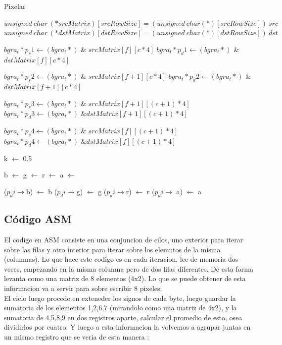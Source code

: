 	\begin{algorithm}[h!]
\caption{Pixelar}
\begin{algorithmic}
	\State $unsigned~ char~ (*srcMatrix)[srcRowSize] = (unsigned~ char (*)[srcRowSize])~ src$
	\State $unsigned~ char~ (*dstMatrix)[dstRowSize] = (unsigned~ char (*)[dstRowSize])~ dst$
	
			\State $bgra_t* p_s1 \gets (bgra_t*)$ \& $srcMatrix[f][c * 4]$
			\State $bgra_t *p_d1 \gets (bgra_t*)$ \&$dstMatrix[f][c * 4]$
			
			\State $bgra_t* p_s2 \gets (bgra_t*)$ \& $srcMatrix[f+1][c * 4]$
			\State $bgra_t *p_d2 \gets (bgra_t*)$ \&$dstMatrix[f+1][c * 4]$
			
			\State $bgra_t* p_s3 \gets (bgra_t*)$ \& $srcMatrix[f+1][(c+1) * 4]$
			\State $bgra_t *p_d3 \gets (bgra_t*)$ \&$dstMatrix[f+1][(c+1) * 4]$
			
			\State $bgra_t* p_s4 \gets (bgra_t*)$ \& $srcMatrix[f][(c+1) * 4]$
			\State $bgra_t *p_d4 \gets (bgra_t*)$ \&$dstMatrix[f][(c+1) * 4]$
			
			\State k $\gets$ 0.5
			
			\State b $\gets$ 
			\State g $\gets$ 
			\State r $\gets$ 
			\State a $\gets$ 
				
				\State ($p_di \rightarrow$b) $\gets$ b
				\State ($p_di \rightarrow$g) $\gets$ g
				\State ($p_di \rightarrow$r) $\gets$ r
				\State ($p_di \rightarrow$ a) $\gets$ a
			\EndFor
		\EndFor
	\EndFor
\EndFunction

\end{algorithmic} 
\end{algorithm}
\subsection{Código ASM}
El codigo en ASM consiste en una conjuncion de cilos, uno exterior para iterar sobre las filas y otro interior para iterar sobre los elemntos de la misma (columnas). Lo que hace este codigo es en cada iteracion, lee de memoria dos veces, empezando en la misma columna pero de dos filas diferentes. De esta forma levanta como una matriz de 8 elementos (4x2). Lo que se puede obtener de esta informacion va a servir para sobre escribir 8 pixeles. \\ El ciclo luego procede en exteneder los signos de cada byte, luego guardar la sumatoria de los elementos {1,2,6,7} (mirandolo como una matriz de 4x2), y la sumatoria de {4,5,8,9} en dos registros aparte, calcular el promedio de esto, osea dividirlos por cuatro. Y luego a esta informacion la volvemos a agrupar juntas en un mismo registro que se veria de esta manera :

